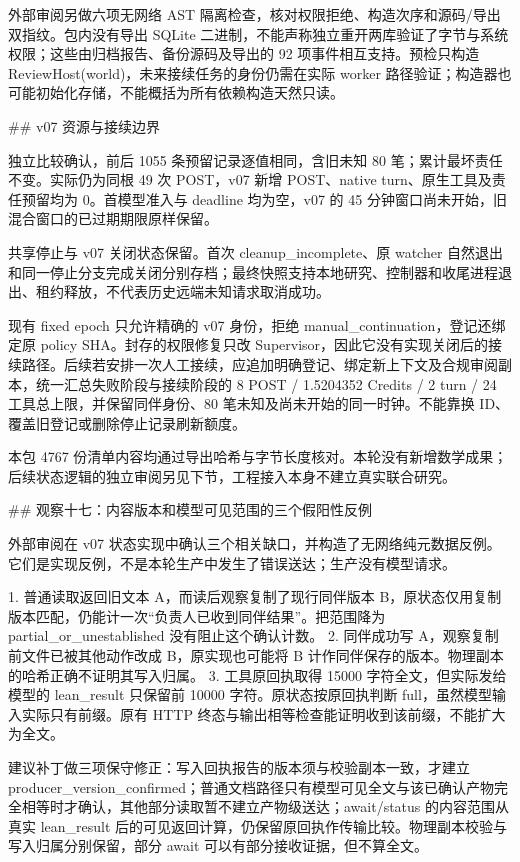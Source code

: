 外部审阅另做六项无网络 AST 隔离检查，核对权限拒绝、构造次序和源码/导出双指纹。包内没有导出 SQLite 二进制，不能声称独立重开两库验证了字节与系统权限；这些由归档报告、备份源码及导出的 92 项事件相互支持。预检只构造 ReviewHost(world)，未来接续任务的身份仍需在实际 worker 路径验证；构造器也可能初始化存储，不能概括为所有依赖构造天然只读。

## v07 资源与接续边界

独立比较确认，前后 1055 条预留记录逐值相同，含旧未知 80 笔；累计最坏责任不变。实际仍为同根 49 次 POST，v07 新增 POST、native turn、原生工具及责任预留均为 0。首模型准入与 deadline 均为空，v07 的 45 分钟窗口尚未开始，旧混合窗口的已过期期限原样保留。

共享停止与 v07 关闭状态保留。首次 cleanup_incomplete、原 watcher 自然退出和同一停止分支完成关闭分别存档；最终快照支持本地研究、控制器和收尾进程退出、租约释放，不代表历史远端未知请求取消成功。

现有 fixed epoch 只允许精确的 v07 身份，拒绝 manual_continuation，登记还绑定原 policy SHA。封存的权限修复只改 Supervisor，因此它没有实现关闭后的接续路径。后续若安排一次人工接续，应追加明确登记、绑定新上下文及合规审阅副本，统一汇总失败阶段与接续阶段的 8 POST / 1.5204352 Credits / 2 turn / 24 工具总上限，并保留同伴身份、80 笔未知及尚未开始的同一时钟。不能靠换 ID、覆盖旧登记或删除停止记录刷新额度。

本包 4767 份清单内容均通过导出哈希与字节长度核对。本轮没有新增数学成果；后续状态逻辑的独立审阅另见下节，工程接入本身不建立真实联合研究。

## 观察十七：内容版本和模型可见范围的三个假阳性反例

外部审阅在 v07 状态实现中确认三个相关缺口，并构造了无网络纯元数据反例。它们是实现反例，不是本轮生产中发生了错误送达；生产没有模型请求。

1. 普通读取返回旧文本 A，而读后观察复制了现行同伴版本 B，原状态仅用复制版本匹配，仍能计一次“负责人已收到同伴结果”。把范围降为 partial_or_unestablished 没有阻止这个确认计数。
2. 同伴成功写 A，观察复制前文件已被其他动作改成 B，原实现也可能将 B 计作同伴保存的版本。物理副本的哈希正确不证明其写入归属。
3. 工具原回执取得 15000 字符全文，但实际发给模型的 lean_result 只保留前 10000 字符。原状态按原回执判断 full，虽然模型输入实际只有前缀。原有 HTTP 终态与输出相等检查能证明收到该前缀，不能扩大为全文。

建议补丁做三项保守修正：写入回执报告的版本须与校验副本一致，才建立 producer_version_confirmed；普通文档路径只有模型可见全文与该已确认产物完全相等时才确认，其他部分读取暂不建立产物级送达；await/status 的内容范围从真实 lean_result 后的可见返回计算，仍保留原回执作传输比较。物理副本校验与写入归属分别保留，部分 await 可以有部分接收证据，但不算全文。

